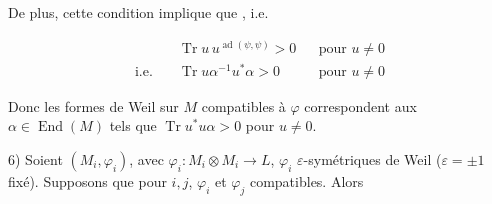 De plus, cette condition implique que  , i.e.

\[
\begin{aligned}
&\operatorname{Tr}u\,u^{\operatorname{ad}(\psi,\psi)}>0 &&\text{pour }u\ne0\\
\text{i.e.}\quad &\operatorname{Tr}u\alpha^{-1}u^*\alpha>0 &&\text{pour }u\ne0
\end{aligned}
\]

Donc les formes de Weil sur $M$ compatibles à $\varphi$ correspondent aux  $\alpha\in\operatorname{End}(M)$ tels que $\operatorname{Tr}u^*u\alpha>0$ pour $u\ne0$. 


6) Soient  $(M_i,\varphi_i)$,  avec $\varphi_i:M_i\otimes M_i\to L$, $\varphi_i$ $\varepsilon$-symétriques de Weil ($\varepsilon=\pm1$ fixé). Supposons que pour $i,j$, $\varphi_i$ et $\varphi_j$ compatibles. Alors

